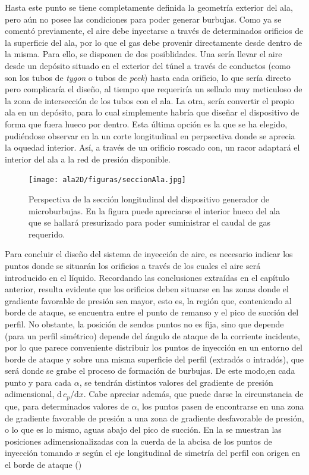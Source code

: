 Hasta este punto se tiene completamente definida la geometría exterior del ala, pero aún no posee las condiciones para poder generar burbujas. Como ya se comentó previamente, el aire debe inyectarse a través de determinados orificios de la  superficie del ala, por lo que el gas debe provenir directamente desde dentro de la misma. Para ello, se disponen de dos posiblidades. Una sería llevar el aire  desde un depósito situado en el exterior del túnel a través de conductos (como son los tubos de \emph{tygon} o tubos de \emph{peek}) hasta cada orificio, lo que sería directo pero complicaría el diseño, al tiempo que requeriría un sellado muy meticuloso de la zona de intersección de los tubos con el ala. La otra, sería convertir el propio ala en un depósito, para lo cual simplemente habría que diseñar el dispositivo de forma que fuera hueco por dentro. Esta última opción es la que se ha elegido, pudiéndose observar en la  un corte longitudinal en perpsectiva donde se aprecia la oquedad interior. Así, a través de  un orificio roscado con, un racor adaptará el interior del ala a la red de presión disponible. 

\begin{figure}
\texttt{[image: ala2D/figuras/seccionAla.jpg]}
\caption{Perspectiva de la sección longitudinal del dispositivo generador de microburbujas. En la figura puede apreciarse el interior hueco del ala que se hallará presurizado para poder suministrar el caudal de gas requerido. }
\end{figure}

Para concluir el diseño del sistema de inyección de aire, es necesario indicar los puntos donde se situarán los orificios a través de los cuales el aire será introducido en el líquido. Recordando las conclusiones extraídas en el capítulo anterior, resulta evidente que los orificios deben situarse en las zonas donde el gradiente favorable de presión sea mayor, esto es, la región que, conteniendo al borde de ataque, se encuentra entre el punto de remanso y el pico de succión del perfil. No obstante, la posición de sendos puntos no es fija, sino que depende (para un perfil simétrico) depende del ángulo de ataque de la corriente incidente, por lo que parece conveniente distribuir los puntos de inyección en un entorno del borde de ataque y sobre una misma superficie del perfil (extradós o intradós), que será donde se grabe el proceso de formación de burbujas. De este modo,en cada punto y para cada $\alpha$, se tendrán distintos valores del gradiente de presión adimensional, $\mathrm{d}\,c_{p}/\mathrm{d}x$. Cabe apreciar además, que puede darse la circunstancia de que, para determinados valores de $\alpha$, los puntos pasen de encontrarse en una zona de gradiente favorable de presión a una zona de gradiente desfavorable de presión, o lo que es lo mismo, aguas abajo del pico de succión. En la  se muestran las posiciones adimensionalizadas con la cuerda de la abcisa de los puntos de inyección tomando $x$ según el eje longitudinal de simetría del perfil con origen en el borde de ataque ()


